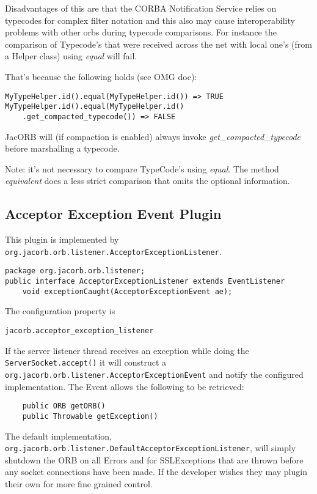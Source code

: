 Disadvantages of this are that the CORBA Notification Service relies on typecodes for complex
filter notation and this also may cause interoperability problems with other orbs during typecode
comparisons. For instance the comparison of Typecode's that were received across the net with
local one's (from a Helper class) using \emph{equal} will fail.

That's because the following holds (see OMG doc):
\begin{verbatim}
MyTypeHelper.id().equal(MyTypeHelper.id()) => TRUE
MyTypeHelper.id().equal(MyTypeHelper.id()
    .get_compacted_typecode()) => FALSE
\end{verbatim}

JacORB will (if compaction is enabled) always invoke \emph{get\_compacted\_typecode} before marshalling a typecode.

Note: it's not necessary to compare TypeCode's using \emph{equal}. The method \emph{equivalent} does a less strict comparison
that omits the optional information.

\subsection{Acceptor Exception Event Plugin}
\label{acceptorevent}
This plugin is implemented by {\tt
org.jacorb.orb.listener.AcceptorExceptionListener}.
\begin{small}
\begin{verbatim}
package org.jacorb.orb.listener;
public interface AcceptorExceptionListener extends EventListener
    void exceptionCaught(AcceptorExceptionEvent ae);
\end{verbatim}
\end{small}
The configuration property is
\begin{verbatim}
jacorb.acceptor_exception_listener
\end{verbatim}
If the server listener thread receives an exception while doing the {\tt
ServerSocket.accept()} it will construct a {\tt
org.jacorb.orb.listener.AcceptorExceptionEvent} and notify the configured
implementation. The Event allows the following to be retrieved:
\begin{small}
\begin{verbatim}
    public ORB getORB()
    public Throwable getException()
\end{verbatim}
\end{small}
The default implementation, {\tt
org.jacorb.orb.listener.DefaultAcceptor\-ExceptionListener}, will simply shutdown
the ORB on all Errors and for SSLExceptions that are thrown before any socket
connections have been made. If the developer wishes they may plugin
their own for more fine grained control.


